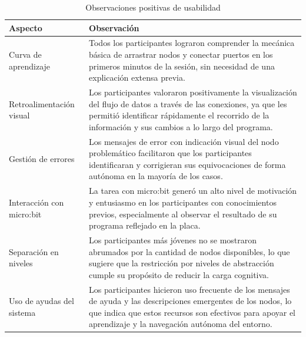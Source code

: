 \begin{table}[H]
    \caption{Observaciones positivas de usabilidad}
    \label{tab:observaciones-positivas}
    \begingroup
    \renewcommand{\TableBodyFontSize}{\footnotesize}
    \begin{tabularx}{\textwidth}{ l X }
        \hline
        \textbf{Aspecto}          & \textbf{Observación}                                                                                                                                                                                                           \\
        \hline
        Curva de aprendizaje      & Todos los participantes lograron comprender la mecánica básica de arrastrar nodos y conectar puertos en los primeros minutos de la sesión, sin necesidad de una explicación extensa previa.                                    \\
        Retroalimentación visual  & Los participantes valoraron positivamente la visualización del flujo de datos a través de las conexiones, ya que les permitió identificar rápidamente el recorrido de la información y sus cambios a lo largo del programa.    \\
        Gestión de errores        & Los mensajes de error con indicación visual del nodo problemático facilitaron que los participantes identificaran y corrigieran sus equivocaciones de forma autónoma en la mayoría de los casos.                               \\
        Interacción con micro:bit & La tarea con micro:bit generó un alto nivel de motivación y entusiasmo en los participantes con conocimientos previos, especialmente al observar el resultado de su programa reflejado en la placa.                            \\
        Separación en niveles     & Los participantes más jóvenes no se mostraron abrumados por la cantidad de nodos disponibles, lo que sugiere que la restricción por niveles de abstracción cumple su propósito de reducir la carga cognitiva.      \\
        Uso de ayudas del sistema & Los participantes hicieron uso frecuente de los mensajes de ayuda y las descripciones emergentes de los nodos, lo que indica que estos recursos son efectivos para apoyar el aprendizaje y la navegación autónoma del entorno. \\
        \hline
    \end{tabularx}
    \endgroup
\end{table}

